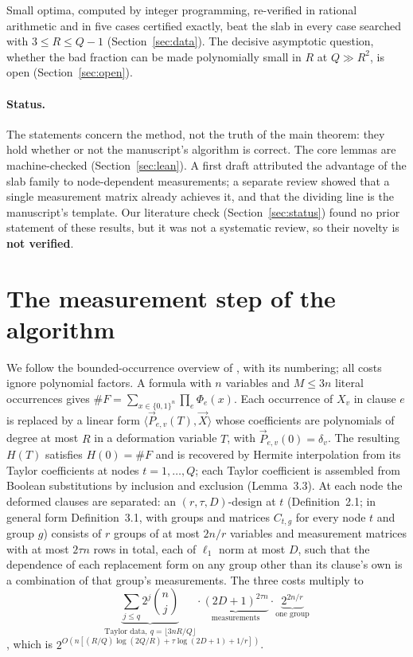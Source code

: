 \documentclass[11pt]{article}
\theoremstyle{definition}
\theoremstyle{remark}
\begin{document}
Small optima, computed by integer programming, re-verified in rational arithmetic and in five cases certified exactly, beat the slab in every case searched with $3\le R\le Q-1$ (Section~\ref{sec:data}). The decisive asymptotic question, whether the bad fraction can be made polynomially small in $R$ at $Q\gg R^2$, is open (Section~\ref{sec:open}).

\paragraph{Status.} The statements concern the method, not the truth of the main theorem: they hold whether or not the manuscript's algorithm is correct. The core lemmas are machine-checked (Section~\ref{sec:lean}). A first draft attributed the advantage of the slab family to node-dependent measurements; a separate review showed that a single measurement matrix already achieves it, and that the dividing line is the manuscript's template. Our literature check (Section~\ref{sec:status}) found no prior statement of these results, but it was not a systematic review, so their novelty is \textbf{not verified}.

\section{The measurement step of the algorithm}\label{sec:setting}

We follow the bounded-occurrence overview of \cite[Section~2]{oai378}, with its numbering; all costs ignore polynomial factors. A formula with $n$ variables and $M\le3n$ literal occurrences gives $\#F=\sum_{x\in\{0,1\}^n}\prod_e\Phi_e(x)$. Each occurrence of $X_v$ in clause $e$ is replaced by a linear form $\langle\vec P_{e,v}(T),\vec X\rangle$ whose coefficients are polynomials of degree at most $R$ in a deformation variable $T$, with $\vec P_{e,v}(0)=\delta_v$. The resulting $H(T)$ satisfies $H(0)=\#F$ and is recovered by Hermite interpolation from its Taylor coefficients at nodes $t=1,\dots,Q$; each Taylor coefficient is assembled from Boolean substitutions by inclusion and exclusion (Lemma~3.3). At each node the deformed clauses are separated: an $(r,\tau,D)$-design at $t$ (Definition~2.1; in general form Definition~3.1, with groups and matrices $C_{t,g}$ for every node $t$ and group $g$) consists of $r$ groups of at most $2n/r$ variables and measurement matrices with at most $2\tau n$ rows in total, each of $\ell_1$ norm at most $D$, such that the dependence of each replacement form on any group other than its clause's own is a combination of that group's measurements. The three costs multiply to
\begin{equation}\label{eq:cost}
\underbrace{\sum_{j\le q}2^j\binom nj}_{\text{Taylor data},\ q=\lfloor3nR/Q\rfloor}\cdot\underbrace{(2D+1)^{2\tau n}}_{\text{measurements}}\cdot\underbrace{2^{2n/r}}_{\text{one group}}
\end{equation}
\cite[display (2.11)]{oai378}, which is $2^{O(n[(R/Q)\log(2Q/R)+\tau\log(2D+1)+1/r])}$.
\end{document}
